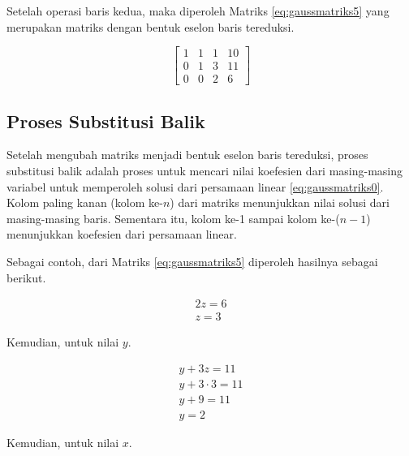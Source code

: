 Setelah operasi baris kedua, maka diperoleh Matriks \ref{eq:gaussmatriks5} yang merupakan matriks dengan bentuk eselon baris tereduksi.

\begin{center}
	\setlength\arraycolsep{10pt}
	\begin{equation}
		\begin{bmatrix}
				1 	& 1 	& 1 	& 10 		\\[1em]
				0 	& 1 	& 3 	& 11 		\\[1em]
				0 	& 0 	& 2 	& 6
		\end{bmatrix} \label{eq:gaussmatriks5}
	\end{equation}
\end{center}

\subsection{Proses Substitusi Balik}

Setelah mengubah matriks menjadi bentuk eselon baris tereduksi, proses substitusi balik adalah proses untuk mencari nilai koefesien dari masing-masing variabel untuk memperoleh solusi dari persamaan linear \ref{eq:gaussmatriks0}. Kolom paling kanan (kolom ke-\begin{math}n\end{math}) dari matriks menunjukkan nilai solusi dari masing-masing baris. Sementara itu, kolom ke-1 sampai kolom ke-(\begin{math}n-1\end{math}) menunjukkan koefesien dari persamaan linear.

Sebagai contoh, dari Matriks \ref{eq:gaussmatriks5} diperoleh hasilnya sebagai berikut.

\begin{gather}
	2z = 6 \nonumber \\
	z = 3 \label{eq:gaussmatriks6}
\end{gather}

Kemudian, untuk nilai \begin{math}y\end{math}.

\begin{gather}
	y + 3z = 11 \nonumber \\
	y + 3\cdot3 = 11 \nonumber \\
	y + 9 = 11 \nonumber \\
	y = 2 \label{eq:gaussmatriks7}
\end{gather}

Kemudian, untuk nilai \begin{math}x\end{math}.

